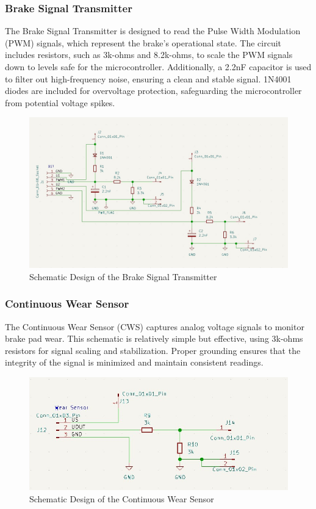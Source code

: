 \documentclass[12pt]{article}
\begin{document}
\subsubsection*{Brake Signal Transmitter}
The Brake Signal Transmitter is designed to read the Pulse Width Modulation
(PWM) signals, which represent the brake’s operational state. The circuit
includes resistors, such as 3k-ohms and 8.2k-ohms, to scale the PWM signals
down to levels safe for the microcontroller. Additionally, a 2.2nF capacitor is
used to filter out high-frequency noise, ensuring a clean and stable signal.
1N4001 diodes are included for overvoltage protection, safeguarding the
microcontroller from potential voltage spikes.

\begin{figure}[H]
  \includegraphics[width=\textwidth]{../assets/pcb/image2.jpg}
  \caption{Schematic Design of the Brake Signal Transmitter}
\end{figure}

\subsubsection*{Continuous Wear Sensor}
The Continuous Wear Sensor (CWS) captures analog voltage signals to monitor
brake pad wear. This schematic is relatively simple but effective, using
3k-ohms resistors for signal scaling and stabilization. Proper grounding
ensures that the integrity of the signal is minimized and maintain consistent
readings.

\begin{figure}[H]
  \includegraphics[width=\textwidth]{../assets/pcb/image3.jpg}
  \caption{Schematic Design of the Continuous Wear Sensor}
\end{figure}
\end{document}
